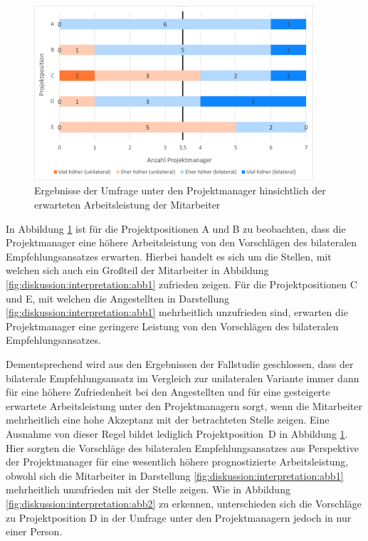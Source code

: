 \begin{figure}[h]
	\centering
	\includegraphics[width=0.925\textwidth]{gfx/ergebnisse-projektmanager-arbeitsleistung.png}	
	\caption{Ergebnisse der Umfrage unter den Projektmanager hinsichtlich der erwarteten Arbeitsleistung der Mitarbeiter}
	\label{fig:diskussion:interpretation:abb4}
\end{figure}

In Abbildung \ref{fig:diskussion:interpretation:abb4} ist für die Projektpositionen A und B zu beobachten, dass die Projektmanager eine höhere Arbeitsleistung von den Vorschlägen des bilateralen Empfehlungsansatzes erwarten. Hierbei handelt es sich um die Stellen, mit welchen sich auch ein Großteil der Mitarbeiter in Abbildung \ref{fig:diskussion:interpretation:abb1} zufrieden zeigen. Für die Projektpositionen C und E, mit welchen die Angestellten in Darstellung \ref{fig:diskussion:interpretation:abb1} mehrheitlich unzufrieden sind, erwarten die Projektmanager eine geringere Leistung von den Vorschlägen des bilateralen Empfehlungsansatzes.

Dementsprechend wird aus den Ergebnissen der Fallstudie geschlossen, dass der bilaterale Empfehlungsansatz im Vergleich zur unilateralen Variante immer dann für eine höhere Zufriedenheit bei den Angestellten und für eine gesteigerte erwartete Arbeitsleistung unter den Projektmanagern sorgt, wenn die Mitarbeiter mehrheitlich eine hohe Akzeptanz mit der betrachteten Stelle zeigen. Eine Ausnahme von dieser Regel bildet lediglich \mbox{Projektposition D} in Abbildung \ref{fig:diskussion:interpretation:abb4}. Hier sorgten die Vorschläge des bilateralen Empfehlungsansatzes aus Perspektive der Projektmanager für eine wesentlich höhere prognostizierte Arbeitsleistung, obwohl sich die Mitarbeiter in Darstellung \ref{fig:diskussion:interpretation:abb1} mehrheitlich unzufrieden mit der Stelle zeigen. Wie in Abbildung \ref{fig:diskussion:interpretation:abb2} zu erkennen, unterschieden sich die Vorschläge zu Projektposition D in der Umfrage unter den Projektmanagern jedoch in nur einer Person.

